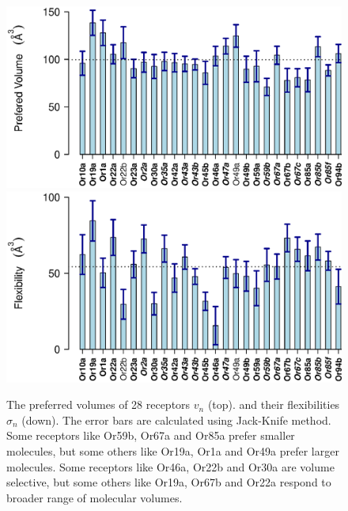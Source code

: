 \documentclass[11pt]{article} %
\newcommand{\numberofreceptors}{ 28 }
\begin{document}
\begin{figure}
		\centering
		\includegraphics[width=  0.85 \textwidth]{fig/mean-vol}
		\includegraphics[width=  0.85 \textwidth]{fig/std-vol}
	\caption{The preferred volumes of \numberofreceptors receptors $v_n$ (top). 
		and their flexibilities $\sigma_n$ (down). 
		The error bars are calculated using Jack-Knife method. 
		Some receptors like Or59b, Or67a and  Or85a prefer smaller molecules, 
		but some others like Or19a,  Or1a and  Or49a prefer larger molecules.
		Some receptors like Or46a,  Or22b and Or30a are volume  selective, 
		but some others like Or19a,  Or67b and  Or22a respond to broader range of molecular volumes.
		}
		\label{fig:preferred_volume}
		\label{fig:volume_flexibility}
\end{figure}
\end{document}
